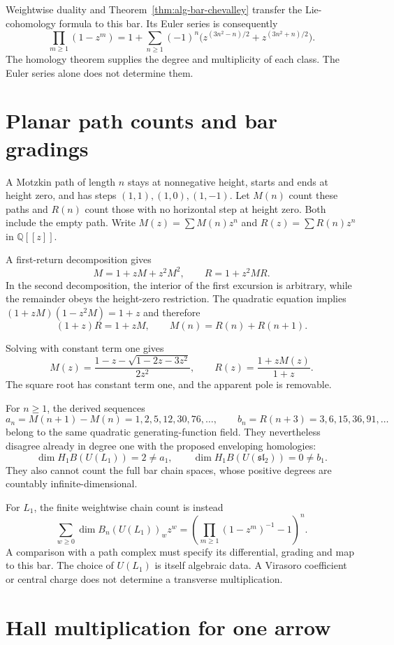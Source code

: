 Weightwise duality and Theorem~\ref{thm:alg-bar-chevalley} transfer the Lie-cohomology formula to this bar.
Its Euler series is consequently
\[
 \prod_{m\ge1}(1-z^m)
 =1+\sum_{n\ge1}(-1)^n
 \bigl(z^{(3n^2-n)/2}+z^{(3n^2+n)/2}\bigr).
\]
The homology theorem supplies the degree and multiplicity of each class. The Euler series alone does not determine them.

\section{Planar path counts and bar gradings}

A Motzkin path of length $n$ stays at nonnegative height, starts and ends at height zero, and has steps $(1,1),(1,0),(1,-1)$.
Let $M(n)$ count these paths and $R(n)$ count those with no horizontal step at height zero.
Both include the empty path.
Write $M(z)=\sum M(n)z^n$ and $R(z)=\sum R(n)z^n$ in $\mathbb Q[[z]]$.

A first-return decomposition gives
\[
 M=1+zM+z^2M^2,\qquad R=1+z^2MR.
\]
In the second decomposition, the interior of the first excursion is arbitrary, while the remainder obeys the height-zero restriction.
The quadratic equation implies
$(1+zM)(1-z^2M)=1+z$ and therefore
\[
 (1+z)R=1+zM,\qquad
 M(n)=R(n)+R(n+1).
\]

Solving with constant term one gives
\[
 M(z)=\frac{1-z-\sqrt{1-2z-3z^2}}{2z^2},
 \qquad R(z)=\frac{1+zM(z)}{1+z}.
\]
The square root has constant term one, and the apparent pole is removable.

For $n\ge1$, the derived sequences
\[
 a_n=M(n+1)-M(n)=1,2,5,12,30,76,\ldots,
 \qquad b_n=R(n+3)=3,6,15,36,91,\ldots
\]
belong to the same quadratic generating-function field.
They nevertheless disagree already in degree one with the proposed enveloping homologies:
\[
 \dim H_1B(U(L_1))=2\ne a_1,
 \qquad \dim H_1B(U(\mathfrak{sl}_2))=0\ne b_1.
\]
They also cannot count the full bar chain spaces, whose positive degrees are countably infinite-dimensional.

For $L_1$, the finite weightwise chain count is instead
\[
 \sum_{w\ge0}\dim B_n(U(L_1))_w z^w
 =\left(\prod_{m\ge1}(1-z^m)^{-1}-1\right)^n.
\]
A comparison with a path complex must specify its differential, grading and map to this bar.
The choice of $U(L_1)$ is itself algebraic data. A Virasoro coefficient or central charge does not determine a transverse multiplication.

\section{Hall multiplication for one arrow}

